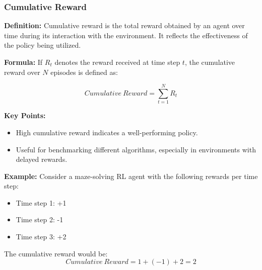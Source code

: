 \documentclass{beamer}
\begin{document}
\begin{frame}[fragile]
    \frametitle{Cumulative Reward}
    
    \textbf{Definition:} Cumulative reward is the total reward obtained by an agent over time during its interaction with the environment. It reflects the effectiveness of the policy being utilized.

    \textbf{Formula:} If \( R_t \) denotes the reward received at time step \( t \), the cumulative reward over \( N \) episodes is defined as:

    \begin{equation}
        Cumulative \ Reward = \sum_{t=1}^{N} R_t
    \end{equation}
    
    \textbf{Key Points:}
    \begin{itemize}
        \item High cumulative reward indicates a well-performing policy.
        \item Useful for benchmarking different algorithms, especially in environments with delayed rewards.
    \end{itemize}

    \textbf{Example:} Consider a maze-solving RL agent with the following rewards per time step:
    \begin{itemize}
        \item Time step 1: +1
        \item Time step 2: -1
        \item Time step 3: +2
    \end{itemize}

    The cumulative reward would be:
    \begin{equation}
        Cumulative \ Reward = 1 + (-1) + 2 = 2
    \end{equation}
\end{frame}
\end{document}
